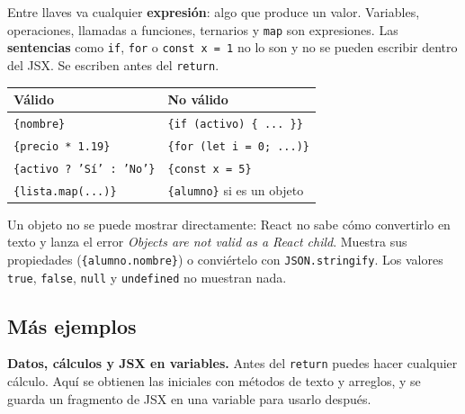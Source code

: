 \documentclass[11pt,a4paper]{article}
\newcommand{\cmd}[1]{\texttt{\color{reactdark}#1}}
\begin{document}
Entre llaves va cualquier \textbf{expresión}: algo que produce un valor. Variables, operaciones, llamadas a funciones, ternarios y \cmd{map} son expresiones. Las \textbf{sentencias} como \cmd{if}, \cmd{for} o \cmd{const x = 1} no lo son y no se pueden escribir dentro del JSX. Se escriben antes del \cmd{return}.

\begin{center}
\small
\begin{tabular}{p{6.3cm} p{6.3cm}}
\toprule
\textbf{Válido} & \textbf{No válido} \\
\midrule
\cmd{\{nombre\}} & \cmd{\{if (activo) \{ ... \}\}} \\
\cmd{\{precio * 1.19\}} & \cmd{\{for (let i = 0; ...)\}} \\
\cmd{\{activo ? 'Sí' : 'No'\}} & \cmd{\{const x = 5\}} \\
\cmd{\{lista.map(...)\}} & \cmd{\{alumno\}} si es un objeto \\
\bottomrule
\end{tabular}
\end{center}

Un objeto no se puede mostrar directamente: React no sabe cómo convertirlo en texto y lanza el error \emph{Objects are not valid as a React child}. Muestra sus propiedades (\cmd{\{alumno.nombre\}}) o conviértelo con \cmd{JSON.stringify}. Los valores \cmd{true}, \cmd{false}, \cmd{null} y \cmd{undefined} no muestran nada.

\subsection{Más ejemplos}

\textbf{Datos, cálculos y JSX en variables.} Antes del \cmd{return} puedes hacer cualquier cálculo. Aquí se obtienen las iniciales con métodos de texto y arreglos, y se guarda un fragmento de JSX en una variable para usarlo después.
\end{document}
